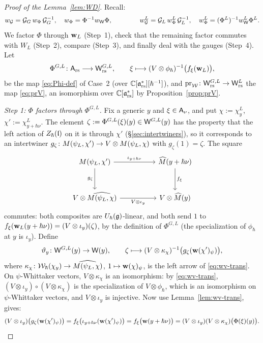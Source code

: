 \documentclass{article}
\theoremstyle{plain}
\theoremstyle{definition}
\theoremstyle{remark}
\numberwithin{equation}{section}
\begin{document}
\begin{proof}[Proof of the Lemma~\ref{lem:WD}]
Recall:
\[
w_{\mathcal G}=\mathcal G_G\,w_\Phi\,\mathcal G_G^{-1},\quad w_\Phi=\Phi^{-1}w_{\mathsf W}\Phi,\qquad\qquad
w^L_{\mathcal G}=\mathcal G_L\,w^L_\Phi\,\mathcal G_L^{-1},\quad w^L_\Phi=(\Phi^L)^{-1}w_{\mathsf W}^L\Phi^L .
\]
We factor $\Phi$ through $\mathbf w_L$ (Step~1), check that the remaining factor commutes with $W_L$ (Step~2), compare (Step~3), and finally deal with the gauges (Step~4). Let
\[
\Phi^{G,L}\colon\mathsf A_{\mathrm{rs}}\longrightarrow\mathsf W^{G,L}_{\mathrm{rs}},\qquad \xi\longmapsto(V\otimes\phi_\hbar)^{-1}\bigl(f_\xi(\mathbf w_L)\bigr),
\]
be the map \eqref{eq:Phi-def} of Case~2 (over $\mathbb{C}[\mathfrak{a}^*_{\mathrm{rs}}][\hbar^{-1}]$), and $\mathrm{pr}_{\mathcal W}\colon\mathsf W^{G,L}_{\mathrm{rs}}\to\mathsf W^L_{\mathrm{rs}}$ the map \eqref{eq:prV}, an isomorphism over $\mathbb{C}[\mathfrak{a}^*_{\mathrm{rs}}]$ by Proposition~\ref{prop:prV}.

\emph{Step 1: $\Phi$ factors through $\Phi^{G,L}$.} Fix a generic $y$ and $\xi\in\mathsf A_\nu$, and put $\chi:=\chi^L_y$, $\chi':=\chi^L_{y+\hbar\nu}$. The element $\zeta:=\Phi^{G,L}(\xi)(y)\in\mathsf W^{G,L}(y)$ has the property that the left action of $Z_\hbar(\mathfrak{l})$ on it is through $\chi'$ (\S\ref{sec:intertwiners}), so it corresponds to an intertwiner $g_\zeta\colon M(\psi_L,\chi')\to V\otimes M(\psi_L, \chi)$ with $g_\zeta(1)=\zeta$. The square
\[
\begin{tikzcd}[column sep=5em,row sep=3em]
M(\psiL,\chi')\arrow[r,"\iota_{y+\hbar\nu}"]\arrow[d,"g_\zeta"'] & \widehat M(y+\hbar\nu)\arrow[d,"f_\xi"]\\
V\otimes\widehat{M(\psiL,\chi)}\arrow[r,"V\otimes\iota_y"'] & V\otimes\widehat M(y)
\end{tikzcd}
\]
commutes: both composites are $U_\hbar(\mathfrak{g})$-linear, and both send $1$ to $f_\xi(\mathbf w_L(y+\hbar\nu))=(V\otimes\iota_y)(\zeta)$, by the definition of $\Phi^{G,L}$ (the specialization of $\phi_\hbar$ at $y$ is $\iota_y$). Define
\[
\vartheta_y\colon\mathsf W^{G,L}(y)\to\mathsf W(y),\qquad \zeta\longmapsto(V\otimes\kappa_\chi)^{-1}\bigl(g_\zeta(\mathbf w(\chi')_\psi)\bigr),
\]
where $\kappa_\chi\colon\mathcal{W}_\hbar(\chi_y)\to\widehat{M(\psi_L, \chi)}$, $1\mapsto\mathbf w(\chi)_\psi$, is the left arrow of \eqref{eq:wv-trans}. On $\psi$-Whittaker vectors, $V\otimes\kappa_\chi$ is an isomorphism: by \eqref{eq:wv-trans}, $(V\otimes\iota_y)\circ(V\otimes\kappa_\chi)$ is the specialization of $V\otimes\phi_\hbar$, which is an isomorphism on $\psi$-Whittaker vectors, and $V\otimes\iota_y$ is injective. Now use Lemma~\ref{lem:wv-trans}, gives:
\[
(V\otimes\iota_y)\bigl(g_\zeta(\mathbf w(\chi')_\psi)\bigr)=f_\xi\bigl(\iota_{y+\hbar\nu}(\mathbf w(\chi')_\psi)\bigr)=f_\xi\bigl(\mathbf w(y+\hbar\nu)\bigr)=(V\otimes\iota_y)(V\otimes\kappa_\chi)\bigl(\Phi(\xi)(y)\bigr).
\]
\end{proof}
\end{document}
